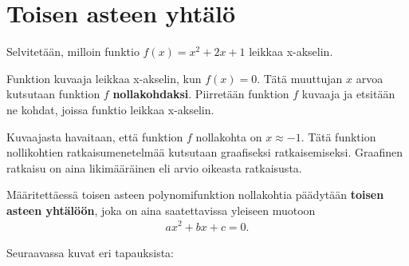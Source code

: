 \section{Toisen asteen yhtälö}


\begin{esimerkki}
Selvitetään, milloin funktio $f(x)=x^2+2x+1$ leikkaa x-akselin.

Funktion kuvaaja leikkaa x-akselin, kun $f(x)=0$. Tätä muuttujan $x$ arvoa kutsutaan funktion $f$ \textbf{nollakohdaksi}. Piirretään funktion $f$ kuvaaja ja etsitään ne kohdat, joissa funktio leikkaa x-akselin. %

\begin{kuvaajapohja}{1.5}{-2.5}{0.5}{-0.5}{3}
\end{kuvaajapohja}
\end{esimerkki}

Kuvaajasta havaitaan, että funktion $f$ nollakohta on $x \approx -1$. Tätä funktion nollikohtien ratkaisumenetelmää kutsutaan graafiseksi ratkaisemiseksi.
Graafinen ratkaisu on aina likimääräinen eli arvio oikeasta ratkaisusta.

Määritettäessä toisen asteen polynomifunktion nollakohtia päädytään \textbf{toisen asteen yhtälöön}, joka on aina saatettavissa yleiseen muotoon
\begin{align*}
ax^2+bx+c=0.
\end{align*}

Seuraavassa kuvat eri tapauksista:


